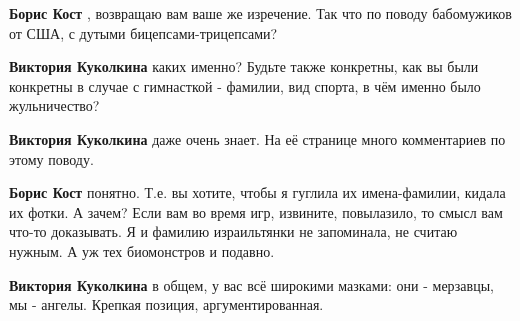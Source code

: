 \begin{itemize}
\begin{itemize}
 
\textbf{Борис Кост} , возвращаю вам ваше же изречение. Так что по поводу бабомужиков от США, с дутыми бицепсами-трицепсами?

 
\textbf{Виктория Куколкина} каких именно? Будьте также конкретны, как вы были
конкретны в случае с гимнасткой - фамилии, вид спорта, в чём именно было
жульничество?

 
\textbf{Виктория Куколкина} даже очень знает. На её странице много комментариев по этому поводу.

 
\textbf{Борис Кост} понятно. Т.е. вы хотите, чтобы я гуглила их имена-фамилии,
кидала их фотки. А зачем? Если вам во время игр, извините, повылазило, то смысл
вам что-то доказывать. Я и фамилию израильтянки не запоминала, не считаю
нужным. А уж тех биомонстров и подавно.

 
\textbf{Виктория Куколкина} в общем, у вас всё широкими мазками: они - мерзавцы, мы - ангелы. Крепкая позиция, аргументированная.

 

\end{itemize}
\end{itemize}
